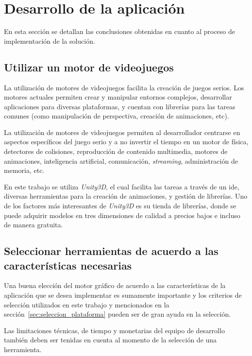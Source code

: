 
\section{Desarrollo de la aplicación}

En esta sección se detallan las conclusiones obtenidas en cuanto al proceso de
implementación de la solución.

\subsection{Utilizar un motor de videojuegos}

La utilización de motores de videojuegos facilita la creación de juegos serios.
Los motores actuales permiten crear y manipular entornos complejos, desarrollar
aplicaciones para diversas plataformas, y cuentan con librerías para las tareas
comunes (como manipulación de perspectiva, creación de animaciones, etc). 

La utilización de motores de videojuegos permiten al desarrollador centrarse en
aspectos específicos del juego serio y a no invertir el tiempo en un motor de
física, detectores de colisiones, reproducción de contenido multimedia, motores
de animaciones, inteligencia artificial, comunicación, \textit{streaming},
administración de memoria, etc.

En este trabajo se utiliza \textit{Unity3D}, el cual facilita las tareas a
través de un \gls{ide}, diversas herramientas para la creación de animaciones, y
gestión de librerías. Uno de los factores más interesantes de \textit{Unity3D}
es su tienda de librerías, donde se puede adquirir modelos en tres dimensiones
de calidad a precios bajos e incluso de manera gratuita.

\subsection{Seleccionar herramientas de acuerdo a las características necesarias}

Una buena elección del motor gráfico de acuerdo a las características de la
aplicación que se desea implementar es sumamente importante y los criterios de
selección utilizados en este trabajo y mencionados en la
sección~\ref{sec:seleccion_plataforma} pueden ser de gran ayuda en la selección.

Las limitaciones técnicas, de tiempo y monetarias del equipo de desarrollo
también deben ser tenidas en cuenta al momento de la selección de una
herramienta.

